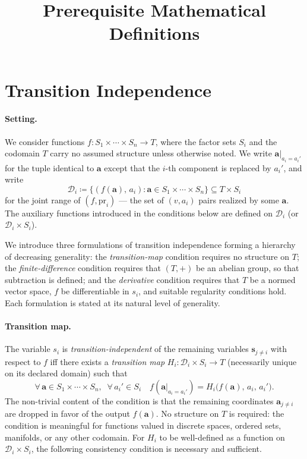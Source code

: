 \documentclass{article}
\title{Prerequisite Mathematical Definitions}
\author{}
\date{}
\theoremstyle{definition}
\theoremstyle{remark}
\begin{document}
\maketitle

\newpage
\section{Transition Independence}
\label{transitionindependence}

\paragraph{Setting.} We consider functions $f \colon S_1 \times \cdots \times S_n \to T$, where the factor sets $S_i$ and the codomain $T$ carry no assumed structure unless otherwise noted. We write $\boldsymbol{a}|_{a_i = a_i'}$ for the tuple identical to $\boldsymbol{a}$ except that the $i$-th component is replaced by $a_i'$, and write
\[
\mathcal{D}_i \coloneqq\{(f(\boldsymbol{a}),\, a_i) : \boldsymbol{a} \in S_1 \times \cdots \times S_n\} \subseteq T \times S_i
\]
for the joint range of $(f, \mathrm{pr}_i)$ --- the set of $(v, a_i)$ pairs realized by some $\boldsymbol{a}$. The auxiliary functions introduced in the conditions below are defined on $\mathcal{D}_i$ (or $\mathcal{D}_i \times S_i$).

We introduce three formulations of transition independence forming a hierarchy of decreasing generality: the \textit{transition-map} condition requires no structure on $T$; the \textit{finite-difference} condition requires that $(T, +)$ be an abelian group, so that subtraction is defined; and the \textit{derivative} condition requires that $T$ be a normed vector space, $f$ be differentiable in $s_i$, and suitable regularity conditions hold. Each formulation is stated at its natural level of generality.

\paragraph{Transition map.} The variable $s_i$ is \textit{transition-independent} of the remaining variables $\boldsymbol{s}_{j \neq i}$ with respect to $f$ iff there exists a \textit{transition map} $H_i \colon \mathcal{D}_i \times S_i \to T$ (necessarily unique on its declared domain) such that
\begin{equation}
\label{transportmap}
\forall\, \boldsymbol{a} \in S_1 \times \cdots \times S_n,\;\; \forall\, a_i' \in S_i \quad
f(\boldsymbol{a}|_{a_i = a_i'}) = H_i\bigl(f(\boldsymbol{a}),\, a_i,\, a_i'\bigr).
\end{equation}
The non-trivial content of the condition is that the remaining coordinates $\boldsymbol{a}_{j \neq i}$ are dropped in favor of the output $f(\boldsymbol{a})$. No structure on $T$ is required: the condition is meaningful for functions valued in discrete spaces, ordered sets, manifolds, or any other codomain. For $H_i$ to be well-defined as a function on $\mathcal{D}_i \times S_i$, the following consistency condition is necessary and sufficient.
\end{document}
